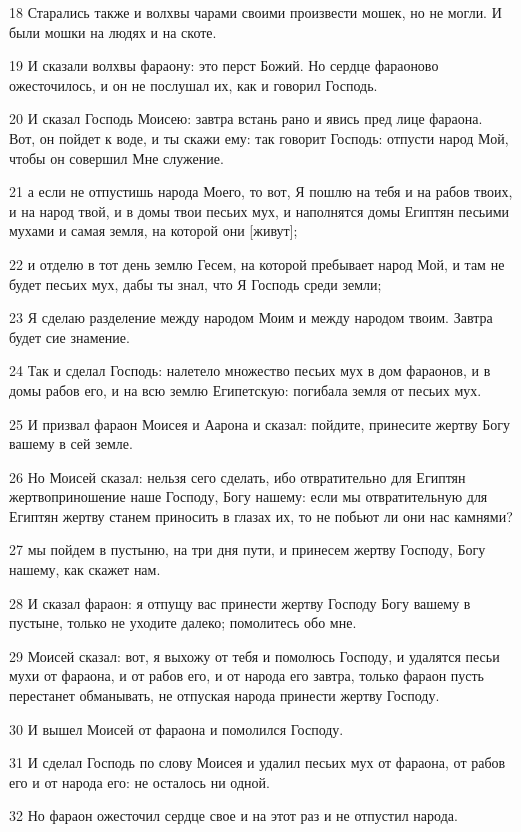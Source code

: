 \par 18 Старались также и волхвы чарами своими произвести мошек, но не могли. И были мошки на людях и на скоте.
\par 19 И сказали волхвы фараону: это перст Божий. Но сердце фараоново ожесточилось, и он не послушал их, как и говорил Господь.
\par 20 И сказал Господь Моисею: завтра встань рано и явись пред лице фараона. Вот, он пойдет к воде, и ты скажи ему: так говорит Господь: отпусти народ Мой, чтобы он совершил Мне служение.
\par 21 а если не отпустишь народа Моего, то вот, Я пошлю на тебя и на рабов твоих, и на народ твой, и в домы твои песьих мух, и наполнятся домы Египтян песьими мухами и самая земля, на которой они [живут];
\par 22 и отделю в тот день землю Гесем, на которой пребывает народ Мой, и там не будет песьих мух, дабы ты знал, что Я Господь среди земли;
\par 23 Я сделаю разделение между народом Моим и между народом твоим. Завтра будет сие знамение.
\par 24 Так и сделал Господь: налетело множество песьих мух в дом фараонов, и в домы рабов его, и на всю землю Египетскую: погибала земля от песьих мух.
\par 25 И призвал фараон Моисея и Аарона и сказал: пойдите, принесите жертву Богу вашему в сей земле.
\par 26 Но Моисей сказал: нельзя сего сделать, ибо отвратительно для Египтян жертвоприношение наше Господу, Богу нашему: если мы отвратительную для Египтян жертву станем приносить в глазах их, то не побьют ли они нас камнями?
\par 27 мы пойдем в пустыню, на три дня пути, и принесем жертву Господу, Богу нашему, как скажет нам.
\par 28 И сказал фараон: я отпущу вас принести жертву Господу Богу вашему в пустыне, только не уходите далеко; помолитесь обо мне.
\par 29 Моисей сказал: вот, я выхожу от тебя и помолюсь Господу, и удалятся песьи мухи от фараона, и от рабов его, и от народа его завтра, только фараон пусть перестанет обманывать, не отпуская народа принести жертву Господу.
\par 30 И вышел Моисей от фараона и помолился Господу.
\par 31 И сделал Господь по слову Моисея и удалил песьих мух от фараона, от рабов его и от народа его: не осталось ни одной.
\par 32 Но фараон ожесточил сердце свое и на этот раз и не отпустил народа.

